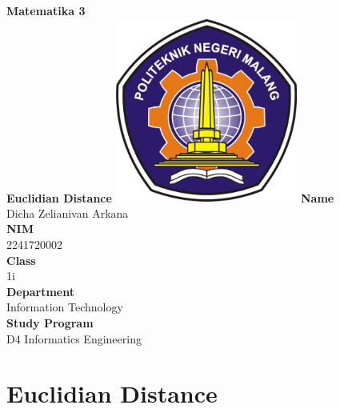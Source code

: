 \documentclass[12pt,titlepage]{article}
\newcommand{\vSubject}{Matematika 3}
\newcommand{\vSubtitle}{Euclidian Distance}
\newcommand{\vName}{Dicha Zelianivan Arkana}
\newcommand{\vNIM}{2241720002}
\newcommand{\vClass}{1i}
\newcommand{\vDepartment}{Information Technology}
\newcommand{\vStudyProgram}{D4 Informatics Engineering}
\begin{document}
\begin{titlepage}
    \centering
    \vfill
    {\bfseries\LARGE
        \vSubject\\
        \vskip0.25cm
        \vSubtitle
    }
    \vfill
    \includegraphics[width=6cm]{images/polinema-logo.png}
    \vfill
    {
        \textbf{Name}\\
        \vName\\
        \vskip0.5cm
        \textbf{NIM}\\
        \vNIM\\
        \vskip0.5cm
        \textbf{Class}\\
        \vClass\\
        \vskip0.5cm
        \textbf{Department}\\
        \vDepartment\\
        \vskip0.5cm
        \textbf{Study Program}\\
        \vStudyProgram
    }
\end{titlepage}

\tableofcontents
\pagebreak

\section{Euclidian Distance}
\end{document}
